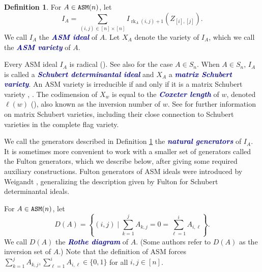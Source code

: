 \documentclass[12 pt]{amsart}
\DeclareMathOperator{\rk}{rk}
\DeclareMathOperator{\asm}{\tt ASM}
\theoremstyle{plain}
\theoremstyle{definition}
\newtheorem{definition}[thm]{Definition}
\theoremstyle{remark}
\newcommand{\newword}[1]{\textcolor{darkblue}{\textbf{\emph{#1}}}}
\begin{document}
\begin{definition}
\label{def:ASMIdeal}
For $A \in \asm(n)$, let \[
    I_A = \sum_{(i,j) \in [n] \times [n]} I_{\rk_A(i,j)+1}(Z_{[i],[j]}).
\]  We call $I_A$ the \newword{ASM ideal} of $A$.  Let $X_A$ denote the variety of $I_A$, which we call the \newword{ASM variety} of $A$.
\end{definition}


Every ASM ideal $I_A$ is radical (\cite[Proposition 5.4]{Wei17}). See also \cite[Proposition 3.3]{Ful92} for the case $A \in S_n$.  When $A \in S_n$, $I_A$ is called a \newword{Schubert determinantal ideal} and $X_A$ a \newword{matrix Schubert variety}.  An ASM variety is irreducible if and only if it is a matrix Schubert variety \cite[Proposition 3.3]{Ful92}, \cite[Proposition 5.4]{Wei17}.  The codimension of $X_w$ is equal to the \newword{Coxeter length} of $w$, denoted $\ell(w)$ (\cite[Proposition 3.3]{Ful92}), also known as the inversion number of $w$.  See \cite{Ful92} for further information on matrix Schubert varieties, including their close connection to Schubert varieties in the complete flag variety.   

We call the generators described in Definition \ref{def:ASMIdeal} the \newword{natural generators} of $I_A$.  It is sometimes more convenient to work with a smaller set of generators called the Fulton generators, which we describe below, after giving some required auxiliary constructions.  Fulton generators of ASM ideals were introduced by Weigandt \cite{Wei17}, generalizing the description given by Fulton \cite{Ful92} for Schubert determinantal ideals.

For $A \in \asm(n)$, let \[
D(A) = \left\{(i,j) \mid \sum_{k = 1}^j A_{k,j} = 0 = \sum_{\ell = 1}^i A_{i,\ell} \right\}.
\] We call $D(A)$ the \newword{Rothe diagram} of $A$.  (Some authors refer to $D(A)$ as the inversion set of $A$.)  Note that the definition of ASM forces $\sum_{k = 1}^j A_{k,j}, \sum_{\ell = 1}^i A_{i,\ell} \in \{0,1\}$ for all $i,j \in [n]$.
\end{document}

